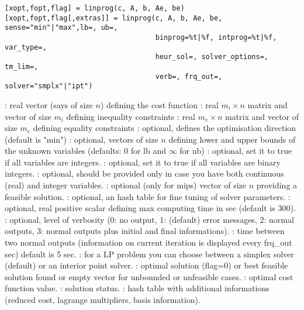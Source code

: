 
\begin{mandesc}
\end{mandesc}

\begin{calling_sequence}
\begin{verbatim}
[xopt,fopt,flag] = linprog(c, A, b, Ae, be)
[xopt,fopt,flag[,extras]] = linprog(c, A, b, Ae, be, sense="min"|"max",lb=, ub=,
                                    binprog=%t|%f, intprog=%t|%f, var_type=,
                                    heur_sol=, solver_options=, tm_lim=, 
                                    verb=, frq_out=, solver="smplx"|"ipt")
\end{verbatim}
\end{calling_sequence}
\begin{parameters}
  \begin{varlist}
    : real vector (says of size $n$) defining the cost function
    : real $m_i \times n$ matrix and vector of size $m_i$ defining inequality constraints
    : real $m_e \times n$ matrix and vector  of size $m_e$ defining equality constraints
    : optional, defines the optimisation direction (default is "min")
    : optional, vectors of size $n$ defining lower and upper bounds of the unknown
                      variables (defaults: $0$ for lb and $\infty$ for ub)
    : optional,  set it to true if all variables are integers.
    : optional, set it to true if all variables are binary integers.
    : optional, should be provided only in case you have both continuous (real) 
                       and integer variables.
    : optional (only for mips) vector of size $n$ providing a feasible solution.
    : optional, an hash table for fine tuning of solver parameters.
    : optional, real positive scalar defining max computing time in sec (default is 300).
    : optional, level of verbosity (0: no output, 1: (default) error messages,
                   2: normal outputs, 3: normal outputs plus initial and final informations).
    : time between two normal outputs (information on current iteration is 
                      displayed every frq\_out sec) default is 5 sec.
    : for a LP problem you can choose between a simplex solver (default) or an 
                     interior point solver.
    : optimal solution (flag=0) or best feasible solution found or empty vector
                  for unbounded or unfeasible cases.
    : optimal cost function value.
    : solution status.
    : hash table with additional informations (reduced cost, lagrange
                    multipliers, basis information).
  \end{varlist}
\end{parameters}

